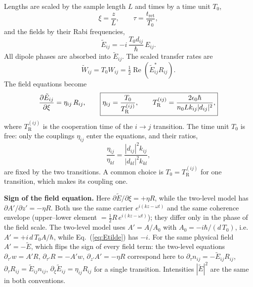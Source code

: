 \documentclass[12pt,a4paper]{article}
\newcommand{\T}{T_0}
\newcommand{\tE}{\tilde{E}}
\newcommand{\tW}{\tilde{W}}
\newcommand{\tret}{t_{\mathrm{ret}}}
\newcommand{\TR}[1]{T_{\mathrm{R}}^{(#1)}}
\begin{document}
Lengths are scaled by the sample length $L$ and times by a time unit $\T$,
\begin{equation}
  \xi = \frac{z}{L}, \qquad \tau = \frac{\tret}{\T},
\end{equation}
and the fields by their Rabi frequencies,
\begin{equation}
  \boxed{\tE_{ij} = -i\,\frac{\T d_{ij}}{\hbar}\,E_{ij}.}
  \label{eq:Etilde}
\end{equation}
All dipole phases are absorbed into $\tE_{ij}$. The scaled transfer rates are
\begin{equation}
  \tW_{ij} = \T W_{ij} = \tfrac{1}{2}\operatorname{Re}\!\left(\tE_{ij}^* R_{ij}\right).
\end{equation}
The field equations become
\begin{equation}
  \pderiv{\tE_{ij}}{\xi} = \eta_{ij}\,R_{ij},
  \qquad
  \boxed{\eta_{ij} = \frac{\T}{\TR{ij}}, \qquad
  \TR{ij} = \frac{2\epsilon_0\hbar}{n_0 L k_{ij} |d_{ij}|^2},}
  \label{eq:eta}
\end{equation}
where $\TR{ij}$ is the cooperation time of the $i\rightarrow j$ transition.
The time unit $\T$ is free: only the couplings $\eta_{ij}$ enter the
equations, and their ratios,
\begin{equation}
  \frac{\eta_{ij}}{\eta_{kl}} = \frac{|d_{ij}|^2 k_{ij}}{|d_{kl}|^2 k_{kl}},
\end{equation}
are fixed by the two transitions. A common choice is $\T = \TR{ij}$ for one
transition, which makes its coupling one.

\begin{notebox}
  \textbf{Sign of the field equation.} Here $\partial\tE/\partial\xi = +\eta R$,
  while the two-level model has $\partial A'/\partial z' = -\eta R$. Both use
  the same carrier $e^{i(kz-\omega t)}$ and the same coherence envelope
  (upper--lower element $= \tfrac12 R\,e^{i(kz-\omega t)}$); they differ only
  in the phase of the field scale. The two-level model uses
  $A' = A/A_0$ with $A_0 = -i\hbar/(d\,\T)$, i.e.\ $A' = +i\,d\,\T A/\hbar$,
  while Eq.~(\ref{eq:Etilde}) has $-i$. For the same physical field
  $A' = -\tE$, which flips the sign of every field term: the two-level
  equations $\partial_{\tau'} w = A'R$, $\partial_{\tau'} R = -A'w$,
  $\partial_{z'}A' = -\eta R$ correspond here to
  $\partial_\tau n_{ij} = -\tE_{ij}R_{ij}$,
  $\partial_\tau R_{ij} = \tE_{ij}n_{ij}$, $\partial_\xi\tE_{ij} = \eta_{ij}R_{ij}$
  for a single transition. Intensities $|\tE|^2$ are the same in both
  conventions.
\end{notebox}
\end{document}
